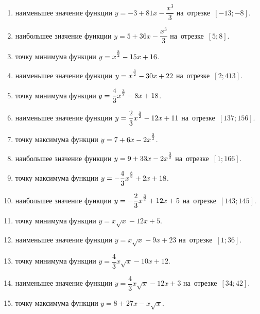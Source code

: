 \documentclass[a4paper,10pt]{article}
\begin{document}
\begin{enumerate}
\item {} наименьшее значение функции $y=-3 +81x-\dfrac{x^3}{3}$ на~отрезке~$\left[-13;-8\right]$.

\item {} наибольшее значение функции $y=5 +36x-\dfrac{x^3}{3}$ на~отрезке~$\left[5;8\right]$.

\item {} точку минимума функции $y=x\strut^{\frac{3}{2}} -15x+16$.

\item {} наименьшее значение функции $y=x\strut^{\frac{3}{2}} -30x+22$ на~отрезке~$\left[2;413\right]$.

\item {} точку минимума функции $y=\dfrac{4}{3}x\strut^{\frac{3}{2}} -8x+18$.

\item {} наименьшее значение функции $y=\dfrac{2}{3}x\strut^{\frac{3}{2}} -12x+11$ на~отрезке~$\left[137;156\right]$.

\item {} точку максимума функции $y=7+6x-2x\strut^{\frac{3}{2}}$.

\item {} наибольшее значение функции $y=9+33x-2x\strut^{\frac{3}{2}}$ на~отрезке~$\left[1;166\right]$.

\item {} точку максимума функции $y=-\dfrac{4}{3}x\strut^{\frac{3}{2}} +2x+18$.

\item {} наибольшее значение функции $y=-\dfrac{2}{3}x\strut^{\frac{3}{2}} +12x+5$ на~отрезке~$\left[143;145\right]$.

\item {} точку минимума функции $y=x\sqrt{x} -12x+5$.

\item {} наименьшее значение функции $y=x\sqrt{x} -9x+23$ на~отрезке~$\left[1;36\right]$.

\item {} точку минимума функции $y=\dfrac{4}{3}x\sqrt{x} -10x+12$.

\item {} наименьшее значение функции $y=\dfrac{4}{3}x\sqrt{x} -12x+3$ на~отрезке~$\left[34;42\right]$.

\item {} точку максимума функции $y=8+27x -x\sqrt{x}$.


\end{enumerate}
\end{document}
